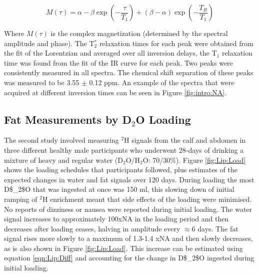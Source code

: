\begin{equation}
    M(\tau) = \alpha - \beta\exp(-\frac{\tau}{T_1}) + (\beta - \alpha)\exp(-\frac{T_R}{T_1})
    \label{eqn:Lip:IR}
\end{equation}

Where $M(\tau)$ is the complex magnetization (determined by the spectral amplitude and phase). The T$_2^*$ relaxation times for each peak were obtained from the fit of the Lorentzian and averaged over all inversion delays, the T$_1$ relaxation time was found from the fit of the \ac{IR} curve for each peak. Two peaks were consistently measured in all spectra. The chemical shift separation of these peaks was measured to be 3.55 $\pm$ 0.12 ppm. An example of the spectra that were acquired at different inversion times can be seen in Figure \ref{fig:intro:NA}.

\subsection{Fat Measurements by D$_2$O Loading}

The second study involved measuring $^2$H signals from the calf and abdomen in three different healthy male participants who underwent 28-days of drinking a mixture of heavy and regular water (D$_2$O/H$_2$O: 70/30\%). Figure \ref{fig:Lip:Load} shows the loading schedules that participants followed, plus estimates of the expected changes in water and fat signals over 120 days. During loading the most \ac{D$_2$O} that was ingested at once was 150 ml, this slowing down of initial ramping of $^2$H enrichment meant that side effects of the loading were minimised. No reports of dizziness or nausea were reported during initial loading. The water signal increases to approximately 100x\ac{NA} in the loading period and then decreases after loading ceases, halving in amplitude every $\approx$6 days. The fat signal rises more slowly to a maximum of 1.3-1.4 x\ac{NA} and then slowly decreases, as is also shown in Figure \ref{fig:Lip:Load}. This increase can be estimated using equation \ref{eqn:Lip:Diff} and accounting for the change in \ac{D$_2$O} ingested during initial loading.  

